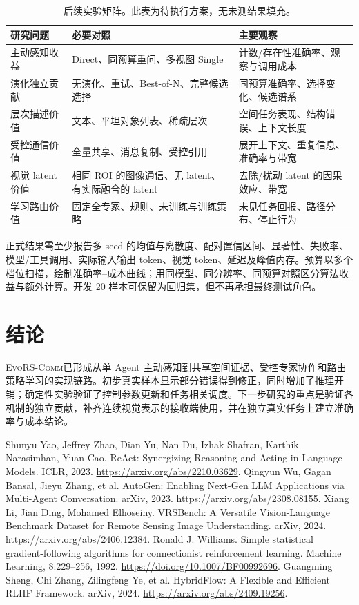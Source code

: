 \documentclass[UTF8,a4paper,zihao=5,fontset=fandol]{ctexart}
\newcommand{\ours}{\textsc{EvoRS-Comm}}
\begin{document}
\begin{table}[h]
\centering\small
\caption{后续实验矩阵。此表为待执行方案，无未测结果填充。}
\begin{tabularx}{\textwidth}{p{27mm}YY}
\toprule
研究问题 & 必要对照 & 主要观察\\
\midrule
主动感知收益 & Direct、同预算重问、多视图 Single & 计数/存在性准确率、观察与调用成本\\
演化独立贡献 & 无演化、重试、Best-of-N、完整候选选择 & 同预算准确率、选择变化、候选谱系\\
层次描述价值 & 文本、平坦对象列表、稀疏层次 & 空间任务表现、结构错误、上下文长度\\
受控通信价值 & 全量共享、消息复制、受控引用 & 展开上下文、重复信息、准确率与带宽\\
视觉 latent 价值 & 相同 ROI 的图像通信、无 latent、有实际融合的 latent & 去除/扰动 latent 的因果效应、带宽\\
学习路由价值 & 固定全专家、规则、未训练与训练策略 & 未见任务回报、路径分布、停止行为\\
\bottomrule
\end{tabularx}
\end{table}

正式结果需至少报告多 seed 的均值与离散度、配对置信区间、显著性、失败率、模型/工具调用、实际输入输出 token、视觉 token、延迟及峰值内存。预算以多个档位扫描，绘制准确率--成本曲线；用同模型、同分辨率、同预算对照区分算法收益与额外计算。开发 20 样本可保留为回归集，但不再承担最终测试角色。

\section{结论}
\ours 已形成从单 Agent 主动感知到共享空间证据、受控专家协作和路由策略学习的实现链路。初步真实样本显示部分错误得到修正，同时增加了推理开销；确定性实验验证了控制参数更新和任务相关调度。下一步研究的重点是验证各机制的独立贡献，补齐连续视觉表示的接收端使用，并在独立真实任务上建立准确率与成本结论。

\newpage
\begin{thebibliography}{9}
\small
{} Shunyu Yao, Jeffrey Zhao, Dian Yu, Nan Du, Izhak Shafran, Karthik Narasimhan, Yuan Cao. ReAct: Synergizing Reasoning and Acting in Language Models. ICLR, 2023. \url{https://arxiv.org/abs/2210.03629}.
 Qingyun Wu, Gagan Bansal, Jieyu Zhang, et al. AutoGen: Enabling Next-Gen LLM Applications via Multi-Agent Conversation. arXiv, 2023. \url{https://arxiv.org/abs/2308.08155}.
 Xiang Li, Jian Ding, Mohamed Elhoseiny. VRSBench: A Versatile Vision-Language Benchmark Dataset for Remote Sensing Image Understanding. arXiv, 2024. \url{https://arxiv.org/abs/2406.12384}.
 Ronald J. Williams. Simple statistical gradient-following algorithms for connectionist reinforcement learning. Machine Learning, 8:229--256, 1992. \url{https://doi.org/10.1007/BF00992696}.
 Guangming Sheng, Chi Zhang, Zilingfeng Ye, et al. HybridFlow: A Flexible and Efficient RLHF Framework. arXiv, 2024. \url{https://arxiv.org/abs/2409.19256}.
\end{thebibliography}
\end{document}
